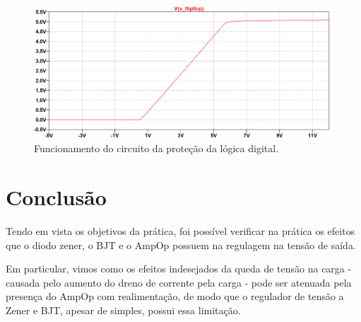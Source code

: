 \documentclass[
	12pt,				%
	oneside,			%
	a4paper,			%
	chapter=TITLE,
	sumario=tradicional,
	english,			%
	brazil				%
]{abntex2}
\begin{document}
\begin{figure}[h!]
	\caption{\label{fig:result-sim-exp2}Funcionamento do circuito da proteção da lógica digital.}
	\begin{center}
    \includegraphics[width=\textwidth,trim=1 1 1 1,clip]{images/result-sim-exp2.png}
	\end{center}
\end{figure}




\chapter{Conclusão}\label{cap:conclusao} 

Tendo em vista os objetivos da prática, foi possível verificar na prática os efeitos que o diodo zener, o BJT e 
o AmpOp possuem na regulagem na tensão de saída. 

Em particular, vimos como os efeitos indesejados da queda de tensão na carga - causada pelo aumento do dreno de corrente 
pela carga - pode ser atenuada pela presença do AmpOp com realimentação, de modo que o regulador de tensão a Zener e BJT,
apesar de simples, possui essa limitação.
\end{document}
